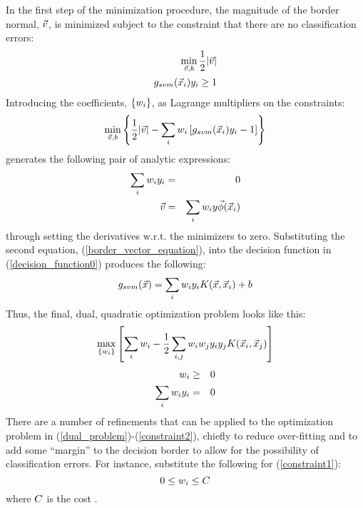 \documentclass{article}
\begin{document}
In the first step of the minimization procedure, 
the magnitude of the border normal, $\vec v$, 
is minimized subject to the constraint that there are no classification 
errors:
\begin{eqnarray*}
	\min_{\vec v, b} \frac{1}{2} | \vec v | \\ \nonumber
	g_{svm}(\vec {x}_i) y_i \ge 1
\end{eqnarray*}
Introducing the coefficients, $\lbrace w_i \rbrace$, 
as Lagrange multipliers on the constraints:
\begin{equation}
	\min_{\vec v, b} \left \lbrace \frac{1}{2} | \vec v | - \sum_i w_i \left [ g_{svm}(\vec {x}_i) y_i -1 \right ] \right \rbrace
\end{equation}
generates the following pair of analytic expressions:
\begin{eqnarray}
	\sum_i w_i y_i & = & 0 \\
	\vec v & = & \sum_i w_i y \vec\phi(\vec {x}_i) \label{border_vector_equation}
\end{eqnarray}
through setting the derivatives w.r.t. the minimizers to zero.
Substituting the second equation, (\ref{border_vector_equation}),
into the decision function in (\ref{decision_function0}) produces the following:
\begin{equation}
	g_{svm}(\vec {x}) = \sum_i w_i y_i K (\vec {x}, \vec {x}_i) + b
	\label{svm_decision}
\end{equation}
Thus, the final, dual, quadratic optimization problem looks like this:
\begin{equation}
	\max_{\lbrace w_i \rbrace} \left [ \sum_i w_i 
	- \frac{1}{2} \sum_{i, j} w_i w_j y_i y_j K(\vec {x}_i, \vec {x}_j) \right ] \label{dual_problem}
\end{equation}
\begin{eqnarray}
	w_i & \ge & 0 \label{constraint1} \\
	\sum_i w_i y_i & = & 0 \label{constraint2}
\end{eqnarray}
There are a number of refinements that can be applied to the optimization
problem in (\ref{dual_problem})-(\ref{constraint2}), chiefly to reduce over-fitting and to add
some ``margin'' to the decision border to allow for the possibility of
classification errors.
For instance, substitute the following for (\ref{constraint1}):
\begin{equation}
 0 \le w_i \le C
 \label{svmcost}
\end{equation}
where $C$ is the cost \citep{Mueller_etal2001}.
\end{document}
